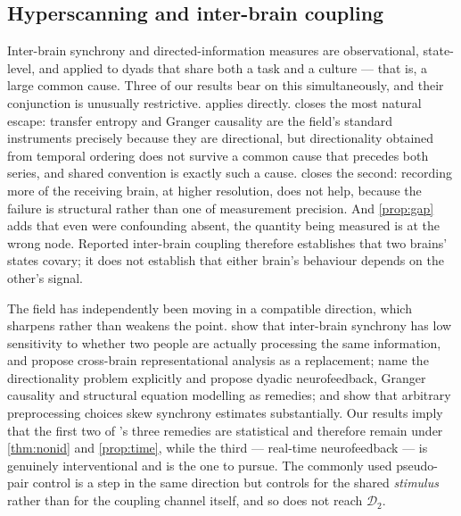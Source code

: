 \documentclass[11pt,a4paper]{article}
\theoremstyle{plain}
\theoremstyle{definition}
\theoremstyle{remark}
\newcommand{\Dy}{\mathcal{D}}
\begin{document}
\subsection{Hyperscanning and inter-brain coupling}\label{sec:hyperscanning}
Inter-brain synchrony and directed-information measures are observational, state-level, and applied to
dyads that share both a task and a culture --- that is, a large common cause. Three of our results bear on
this simultaneously, and their conjunction is unusually restrictive.  applies directly.
 closes the most natural escape: transfer entropy and Granger causality are the field's
standard instruments precisely because they are directional, but directionality obtained from temporal
ordering does not survive a common cause that precedes both series, and shared convention is exactly such a
cause.  closes the second: recording more of the receiving brain, at higher resolution,
does not help, because the failure is structural rather than one of measurement precision. And
\cref{prop:gap} adds that even were confounding absent, the quantity being measured is at the wrong node.
Reported inter-brain coupling therefore establishes that two brains' states covary; it does not establish
that either brain's behaviour depends on the other's signal.

The field has independently been moving in a compatible direction, which sharpens rather than weakens the
point. \citet{varlet2024measuring} show that inter-brain synchrony has low sensitivity to whether two people
are actually processing the same information, and propose cross-brain representational analysis as a
replacement; \citet{markus2024hyperscanning} name the directionality problem explicitly and propose dyadic
neurofeedback, Granger causality and structural equation modelling as remedies; and
\citet{zimmermann2025arbitrary} show that arbitrary preprocessing choices skew synchrony estimates
substantially. Our results imply that the first two of \citeauthor{markus2024hyperscanning}'s three
remedies are statistical and therefore remain under \cref{thm:nonid} and \cref{prop:time}, while the
third --- real-time neurofeedback --- is genuinely interventional and is the one to pursue. The commonly used
pseudo-pair control is a step in the same direction but controls for the shared \emph{stimulus} rather than
for the coupling channel itself, and so does not reach $\Dy_2$.
\end{document}
